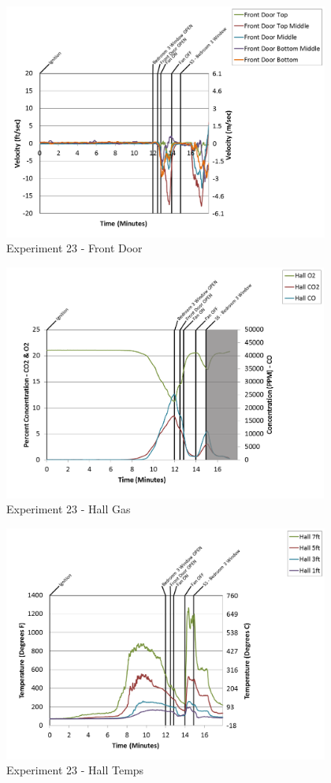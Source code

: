 \documentclass{article}
\begin{document}
\begin{appendices}
\clearpage

\begin{figure}[h!]
	\centering
	\includegraphics[height=3.05in]{0_Images/Results_Charts/Exp_23_Charts/FrontDoor.png}
	\caption{Experiment 23 - Front Door}
\end{figure}


\begin{figure}[h!]
	\centering
	\includegraphics[height=3.05in]{0_Images/Results_Charts/Exp_23_Charts/HallGas.png}
	\caption{Experiment 23 - Hall Gas}
\end{figure}

\clearpage

\begin{figure}[h!]
	\centering
	\includegraphics[height=3.05in]{0_Images/Results_Charts/Exp_23_Charts/HallTemps.png}
	\caption{Experiment 23 - Hall Temps}
\end{figure}



\end{appendices}
\end{document}
